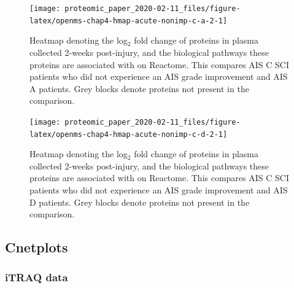 \documentclass[9pt,lineno]{elife}
\begin{document}
\begin{landscape}



\begin{figure}

{\centering \texttt{[image: proteomic\_paper\_2020-02-11\_files/figure-latex/openms-chap4-hmap-acute-nonimp-c-a-2-1]} 

}

\caption[Heatmap - label-free - Acute A VS Acute C Non-Improvers]{Heatmap denoting the log\(_2\) fold change of proteins in plasma collected 2-weeks post-injury, and the biological pathways these proteins are associated with on Reactome. This compares AIS C SCI patients who did not experience an AIS grade improvement and AIS A patients. Grey blocks denote proteins not present in the comparison.}\label{fig:openms-chap4-hmap-acute-nonimp-c-a-2}
\end{figure}

\end{landscape}
\begin{landscape}



\begin{figure}

{\centering \texttt{[image: proteomic\_paper\_2020-02-11\_files/figure-latex/openms-chap4-hmap-acute-nonimp-c-d-2-1]} 

}

\caption[Heatmap - label-free - Acute C Non-Improver VS Acute D]{Heatmap denoting the log\(_2\) fold change of proteins in plasma collected 2-weeks post-injury, and the biological pathways these proteins are associated with on Reactome. This compares AIS C SCI patients who did not experience an AIS grade improvement and AIS D patients. Grey blocks denote proteins not present in the comparison.}\label{fig:openms-chap4-hmap-acute-nonimp-c-d-2}
\end{figure}

\end{landscape}
\clearpage

\hypertarget{sup-cnetplots}{%
\subsection{Cnetplots}\label{sup-cnetplots}}

\hypertarget{itraq-data-1}{%
\subsubsection{iTRAQ data}\label{itraq-data-1}}
\end{document}
